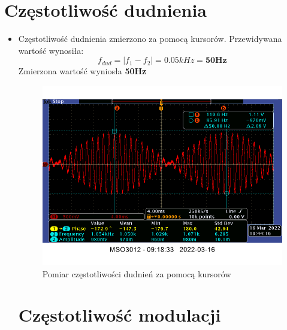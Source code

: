 \section{Częstotliwość dudnienia}
    
\begin{itemize}
    \item Częstotliwość dudnienia zmierzono za pomocą kursorów. Przewidywana wartość wynosiła:
    \begin{equation}
        f_{dud} = |f_1 - f_2| = 0.05kHz = \textbf{50Hz}
    \end{equation}
    Zmierzona wartość wyniosła \textbf{50Hz}
    \begin{figure}[h]
        \centering
        \includegraphics[scale=0.33]{images/1_6-okresdudnien.png}
        \caption{Pomiar częstotliwości dudnień za pomocą kursorów}
        \label{fig:cz_dudnienia}
    \end{figure}
    
\section{Częstotliwość modulacji}
    

\end{itemize}
